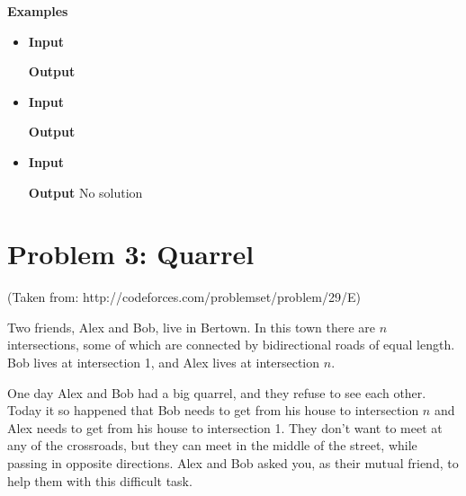\normalfont\documentclass[letterpaper,11pt]{article}
\begin{document}
\textbf{Examples}
\begin{itemize}
\item \textbf{Input}    

\textbf{Output}   

\item \textbf{Input}     

\textbf{Output}    

\item \textbf{Input}     \newline

\textbf{Output} \newline
No solution
\end{itemize}

\newpage

\section*{Problem 3: Quarrel}
(Taken from: http://codeforces.com/problemset/problem/29/E)

Two friends, Alex and Bob, live in Bertown. In this town there are $n$ intersections, some of which are connected by bidirectional roads of equal length. Bob lives at intersection 1, and Alex lives at intersection $n$.

One day Alex and Bob had a big quarrel, and they refuse to see each other. Today it so happened that Bob needs to get from his house to intersection $n$ and Alex needs to get from his house to intersection 1. They don't want to meet at any of the crossroads, but they can meet in the middle of the street, while passing in opposite directions. Alex and Bob asked you, as their mutual friend, to help them with this difficult task.
\end{document}
